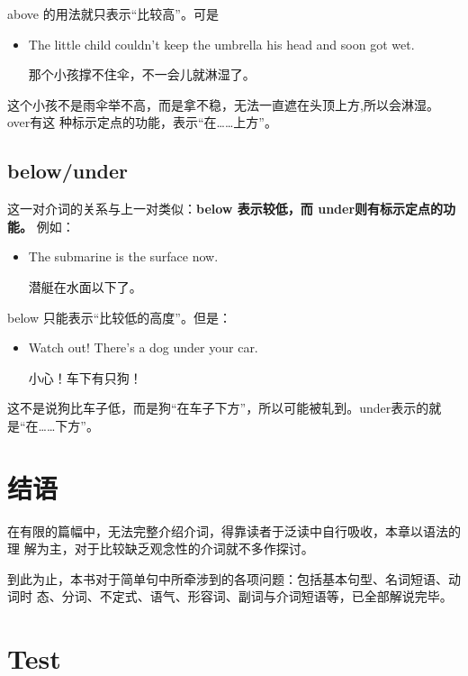 above 的用法就只表示“比较高”。可是
\begin{itemize}
\item The little child couldn't keep the umbrella  his head and soon got
  wet.

  那个小孩撑不住伞，不一会儿就淋湿了。
\end{itemize}
这个小孩不是雨伞举不高，而是拿不稳，无法一直遮在头顶上方,所以会淋湿。over有这
种标示定点的功能，表示“在……上方”。

\subsection{below/under}

这一对介词的关系与上一对类似：\textbf{below 表示较低，而 under则有标示定点的功能。}
例如：
\begin{itemize}
\item  The submarine is  the surface now.

  潜艇在水面以下了。
\end{itemize}

below 只能表示“比较低的高度”。但是：
\begin{itemize}
\item  Watch out! There's a dog under your car.

  小心！车下有只狗！
\end{itemize}
这不是说狗比车子低，而是狗“在车子下方”，所以可能被轧到。under表示的就
是“在……下方”。

\section{结语}

在有限的篇幅中，无法完整介绍介词，得靠读者于泛读中自行吸收，本章以语法的理
解为主，对于比较缺乏观念性的介词就不多作探讨。

到此为止，本书对于简单句中所牵涉到的各项问题：包括基本句型、名词短语、动词时
态、分词、不定式、语气、形容词、副词与介词短语等，已全部解说完毕。

\section{Test}

